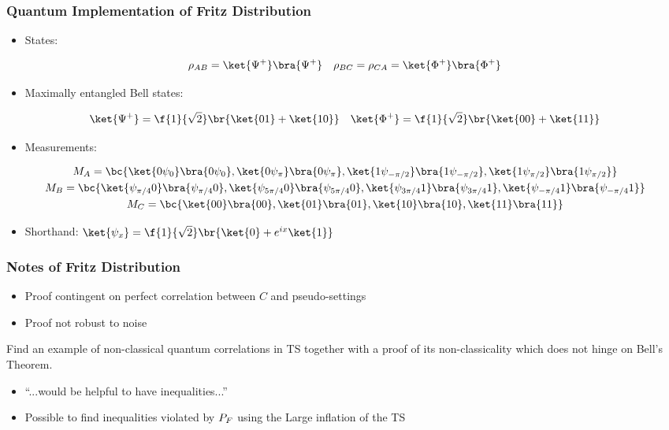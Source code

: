 \documentclass[
    hyperref={bookmarks=false},%
    xcolor={dvipsnames},
]{beamer}
\begin{document}
\begin{frame}
    \frametitle{Quantum Implementation of Fritz Distribution}
    \begin{itemize}
        \item States:
    \end{itemize}
    \begin{gather*}
        \rho_{AB} = \ket{\Psi^+}\bra{\Psi^+} \quad \rho_{BC} = \rho_{CA} = \ket{\Phi^+}\bra{\Phi^+}
    \end{gather*}
    \begin{itemize}
        \item Maximally entangled Bell states:
    \end{itemize}
    \[ \ket{\Psi^+} = \f{1}{\sqrt{2}}\br{\ket{01} + \ket{10}} \quad \ket{\Phi^+} = \f{1}{\sqrt{2}}\br{\ket{00} + \ket{11}} \]
    \begin{itemize}
        \item Measurements:
    \end{itemize}
    \begin{gather*}
        M_{A} = \bc{\ket{0\psi_0}\bra{0\psi_0}, \ket{0\psi_{\pi}}\bra{0\psi_{\pi}}, \ket{1\psi_{-\pi/2}}\bra{1\psi_{-\pi/2}}, \ket{1\psi_{\pi/2}}\bra{1\psi_{\pi/2}}} \\
        M_{B} = \bc{\ket{\psi_{\pi/4}0}\bra{\psi_{\pi/4}0}, \ket{\psi_{5\pi/4}0}\bra{\psi_{5\pi/4}0}, \ket{\psi_{3\pi/4}1}\bra{\psi_{3\pi/4}1}, \ket{\psi_{-\pi/4}1}\bra{\psi_{-\pi/4}1}} \\
        M_{C} = \bc{\ket{00}\bra{00}, \ket{01}\bra{01}, \ket{10}\bra{10}, \ket{11}\bra{11}}
    \end{gather*}
    \begin{itemize}
        \item Shorthand: $\ket{\psi_x} = \f{1}{\sqrt{2}}\br{\ket{0} + e^{ix}\ket{1}}$
    \end{itemize}
\end{frame}

\begin{frame}
    \frametitle{Notes of Fritz Distribution}
    \begin{itemize}
        \item Proof contingent on perfect correlation between $C$ and pseudo-settings
        \item Proof not robust to noise
    \end{itemize}
    \begin{problem}
        Find an example of non-classical quantum correlations in TS together with a proof of its non-classicality which does not hinge on Bell’s Theorem.
    \end{problem}
    \begin{itemize}
        \item ``...would be helpful to have inequalities...''
        \item Possible to find inequalities violated by $\prob[F]$ using the Large inflation of the TS
    \end{itemize}
\end{frame}
\end{document}
